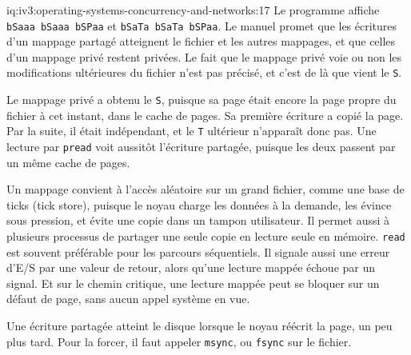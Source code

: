 \begin{solution}{iq:iv3:operating-systems-concurrency-and-networks:17}
Le programme affiche \texttt{b\textquotesingle{}Saaa\textquotesingle{} b\textquotesingle{}Saaa\textquotesingle{} b\textquotesingle{}SPaa\textquotesingle{}} et \texttt{b\textquotesingle{}SaTa\textquotesingle{} b\textquotesingle{}SaTa\textquotesingle{} b\textquotesingle{}SPaa\textquotesingle{}}. Le manuel promet que les écritures d'un mappage partagé atteignent le fichier et les autres mappages, et que celles d'un mappage privé restent privées. Le fait que le mappage privé voie ou non les modifications ultérieures du fichier n'est pas précisé, et c'est de là que vient le \texttt{S}.

Le mappage privé a obtenu le \texttt{S}, puisque sa page était encore la page propre du fichier à cet instant, dans le cache de pages. Sa première écriture a copié la page. Par la suite, il était indépendant, et le \texttt{T} ultérieur n'apparaît donc pas. Une lecture par \texttt{pread} voit aussitôt l'écriture partagée, puisque les deux passent par un même cache de pages.

Un mappage convient à l'accès aléatoire sur un grand fichier, comme une base de ticks (tick store), puisque le noyau charge les données à la demande, les évince sous pression, et évite une copie dans un tampon utilisateur. Il permet aussi à plusieurs processus de partager une seule copie en lecture seule en mémoire. \texttt{read} est souvent préférable pour les parcours séquentiels. Il signale aussi une erreur d'E/S par une valeur de retour, alors qu'une lecture mappée échoue par un signal. Et sur le chemin critique, une lecture mappée peut se bloquer sur un défaut de page, sans aucun appel système en vue.

Une écriture partagée atteint le disque lorsque le noyau réécrit la page, un peu plus tard. Pour la forcer, il faut appeler \texttt{msync}, ou \texttt{fsync} sur le fichier.

\end{solution}

